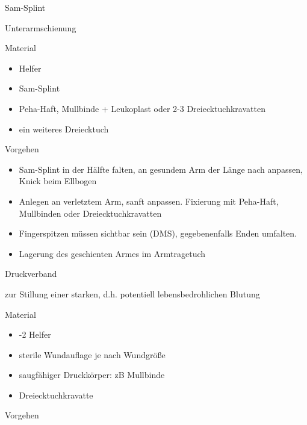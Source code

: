 \documentclass{article}
\begin{document}
{\mdseries\color[rgb]{0.0,0.0,0.5019608}
Sam-Splint}

{
Unterarmschienung}

{\mdseries\color{black}
Material}

\begin{itemize}
\item { Helfer}

\item {\mdseries
Sam-Splint}

\item {\mdseries
Peha-Haft, Mullbinde + Leukoplast oder 2-3 Dreiecktuchkravatten}

\item {\mdseries
ein weiteres Dreiecktuch}

\end{itemize}
{\mdseries\color{black}
Vorgehen}

\begin{itemize}
\item {\mdseries
Sam-Splint in der H\"alfte falten, an gesundem Arm der L\"ange nach
anpassen, Knick beim Ellbogen}

\item {\mdseries
Anlegen an verletztem Arm, sanft anpassen. Fixierung mit Peha-Haft,
Mullbinden oder Dreiecktuchkravatten}

\item {\mdseries
Fingerspitzen m\"ussen sichtbar sein (DMS), gegebenenfalls Enden
umfalten.}

\item {\mdseries
Lagerung des geschienten Armes im Armtragetuch}

\end{itemize}
{\mdseries\color[rgb]{0.0,0.0,0.5019608}
Druckverband}

{
zur Stillung einer starken, d.h. potentiell lebensbedrohlichen Blutung}

{\mdseries\color{black}
Material}

\begin{itemize}
\item {-2 Helfer}

\item {\mdseries
sterile Wundauflage je nach Wundgr\"o{\ss}e}

\item {\mdseries
saugf\"ahiger Druckk\"orper: zB Mullbinde}

\item {\mdseries
Dreiecktuchkravatte}

\end{itemize}
{\mdseries\color{black}
Vorgehen}
\end{document}
